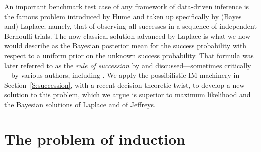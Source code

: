 \documentclass[a4paper, 12pt]{article}
\theoremstyle{plain}
\theoremstyle{definition}
\theoremstyle{remark}
\begin{document}
An important benchmark test case of any framework of data-driven inference is the famous problem introduced by Hume and taken up specifically by (Bayes and) Laplace; namely, that of observing all successes in a sequence of independent Bernoulli trials.  The now-classical solution advanced by Laplace is what we now would describe as the Bayesian posterior mean for the success probability with respect to a uniform prior on the unknown success probability.  That formula  was later referred to as the {\em rule of succession} by \citet[][Ch.~8]{venn.chance} and discussed---sometimes critically---by various authors, including \citet{fisher1973}.  We apply the possibilistic IM machinery in Section~\ref{S:succession}, with a recent decision-theoretic twist, to develop a new solution to this problem, which we argue is superior to maximum likelihood and the Bayesian solutions of Laplace and of Jeffreys.  




\section{The problem of induction}
\label{S:induction}
\end{document}
